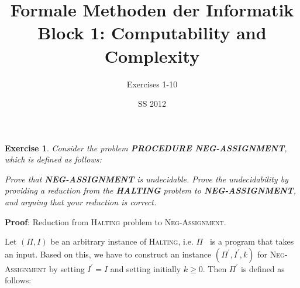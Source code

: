 \documentclass[11pt]{article}
\newtheorem{exercise}[theorem]{Exercise}
\begin{document}
\title{Formale Methoden der Informatik \\
Block 1: Computability and Complexity }
\author{Exercises 1-10}
\date{SS 2012}
\maketitle

\begin{exercise}
Consider the problem \textbf{PROCEDURE NEG-ASSIGNMENT}, which is defined as
follows:


Prove that \textbf{NEG-ASSIGNMENT} is undecidable. Prove the undecidability
by providing a reduction from the \textbf{HALTING} problem to \textbf{%
NEG-ASSIGNMENT}, and arguing that your reduction is correct.
\end{exercise}

\textbf{Proof}: Reduction from \textsc{Halting} problem to \textsc{%
Neg-Assignment}.

Let $(\Pi ,I)$ be an arbitrary instance of \textsc{Halting}, i.e. $\Pi $ \
is a program that takes an input. Based on this, we have to construct an
instance $(\Pi ^{\prime },I^{\prime },k)$ for \textsc{Neg-Assignment} by
setting $I^{\prime }=I$ and setting initially $k\geq 0$. Then $\Pi ^{\prime
} $ is defined as follows:
\end{document}
